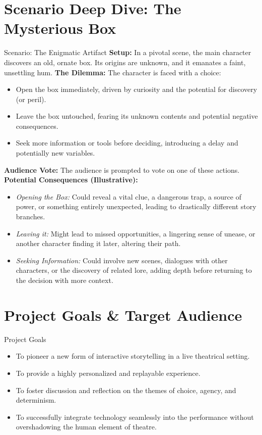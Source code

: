 \documentclass[aspectratio=169]{beamer}
\begin{document}
\section{Scenario Deep Dive: The Mysterious Box}
\begin{frame}{Scenario: The Enigmatic Artifact}
    \textbf{Setup:} In a pivotal scene, the main character discovers an old, ornate box. Its origins are unknown, and it emanates a faint, unsettling hum.
    \newline\newline
    \textbf{The Dilemma:} The character is faced with a choice:
    \begin{itemize}
        \item Open the box immediately, driven by curiosity and the potential for discovery (or peril).
        \item Leave the box untouched, fearing its unknown contents and potential negative consequences.
        \item Seek more information or tools before deciding, introducing a delay and potentially new variables.
    \end{itemize}
    \textbf{Audience Vote:} The audience is prompted to vote on one of these actions.
    \newline\newline
    \textbf{Potential Consequences (Illustrative):}
    \begin{itemize}
        \item \textit{Opening the Box:} Could reveal a vital clue, a dangerous trap, a source of power, or something entirely unexpected, leading to drastically different story branches.
        \item \textit{Leaving it:} Might lead to missed opportunities, a lingering sense of unease, or another character finding it later, altering their path.
        \item \textit{Seeking Information:} Could involve new scenes, dialogues with other characters, or the discovery of related lore, adding depth before returning to the decision with more context.
    \end{itemize}
\end{frame}

\section{Project Goals & Target Audience}
\begin{frame}{Project Goals}
    \begin{itemize}
        \item To pioneer a new form of interactive storytelling in a live theatrical setting.
        \item To provide a highly personalized and replayable experience.
        \item To foster discussion and reflection on the themes of choice, agency, and determinism.
        \item To successfully integrate technology seamlessly into the performance without overshadowing the human element of theatre.
    \end{itemize}
\end{frame}
\end{document}
